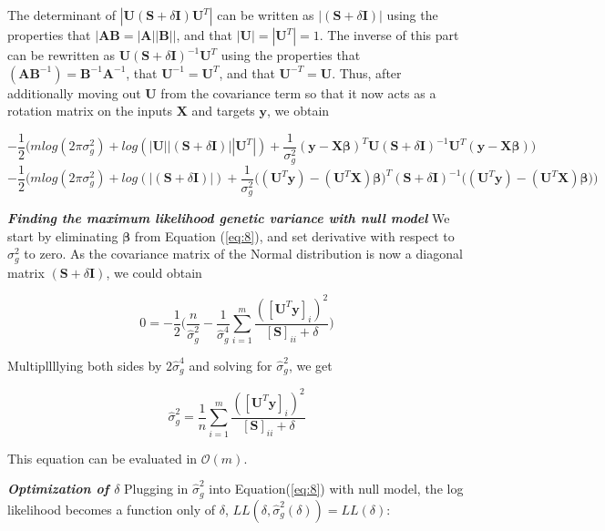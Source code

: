\documentclass[11pt]{article}
\theoremstyle{plain}
\theoremstyle{definition}
\theoremstyle{remark}
\begin{document}
The determinant of $|\bm{U}(\bm{S}+\delta{\bm{I}})\bm{U}^T|$ can be written as $|(\bm{S}+\delta{\bm{I}})|$ using the properties that $|\bm{AB}=|\bm{A}||\bm{B}||$, and that $|\bm{U}|=|\bm{U}^T|=1$. The inverse of this part can be rewritten as $\bm{U}(\bm{S}+\delta\bm{I})^{-1}\bm{U}^T$ using the properties that $(\bm{AB}^{-1})=\bm{B}^{-1}\bm{A}^{-1}$, that $\bm{U}^{-1}=\bm{U}^T$, and that $\bm{U}^{-T}=\bm{U}$. Thus, after additionally moving out $\bm{U}$ from the covariance term so that it now acts as a rotation matrix on the inputs $\bm{X}$ and targets $\bm{y}$, we obtain

\begin{equation*}
-\frac{1}{2}\Big(mlog(2\pi\sigma_g^2)+log(|\bm{U}||(\bm{S}+\delta\bm{I})||\bm{U}^T|)+\frac{1}{\sigma_g^2}(\bm{y}-\bm{X\beta})^T\bm{U}(\bm{S}+\delta{\bm{I}})^{-1}\bm{U}^T(\bm{y}-\bm{X\beta})\Big)
\end{equation*}
\begin{equation}
\label{eq:8}
-\frac{1}{2}\Big(mlog(2\pi\sigma_g^2)+log(|(\bm{S}+\delta\bm{I})|)+\frac{1}{\sigma_g^2}\big((\bm{U}^T\bm{y})-(\bm{U}^T\bm{X})\bm\beta\big)^T(\bm{S}+\delta{\bm{I}})^{-1}\big((\bm{U}^T\bm{y})-(\bm{U}^T\bm{X})\bm\beta\big)\Big)
\end{equation}

\textbf{\em Finding the maximum likelihood genetic variance with null model} We start by eliminating $\bm\beta$ from Equation (\ref{eq:8}), and set derivative with respect to $\sigma_g^2$ to zero. As the covariance matrix of the Normal distribution is now a diagonal matrix $(\bm{S}+\delta\bm{I})$, we could obtain

\begin{equation*}
0=-\frac{1}{2}\Bigg(\frac{n}{\hat{\sigma}_g^2}-\frac{1}{\hat{\sigma}_g^4}\sum_{i=1}^m\frac{([\bm{U}^T\bm{y}]_i)^2}{[\bm{S}]_{ii}+\delta} \Bigg)
\end{equation*}

Multipllllying both sides by $2\hat{\sigma}_g^4$ and solving for $\hat{\sigma}_g^2$, we get

\begin{equation*}
\hat{\sigma}_g^2=\frac{1}{n}\sum_{i=1}^m\frac{([\bm{U}^T\bm{y}]_i)^2}{[\bm{S}]_{ii}+\delta}
\end{equation*}

This equation can be evaluated in $\mathcal{O}(m)$.

\textbf{\em Optimization of $\delta$} Plugging in $\hat{\sigma}_g^2$ into Equation(\ref{eq:8}) with null model, the log likelihood becomes a function only of $\delta$, $LL(\delta,\hat{\sigma}_g^2(\delta))=LL(\delta)$:
\end{document}
